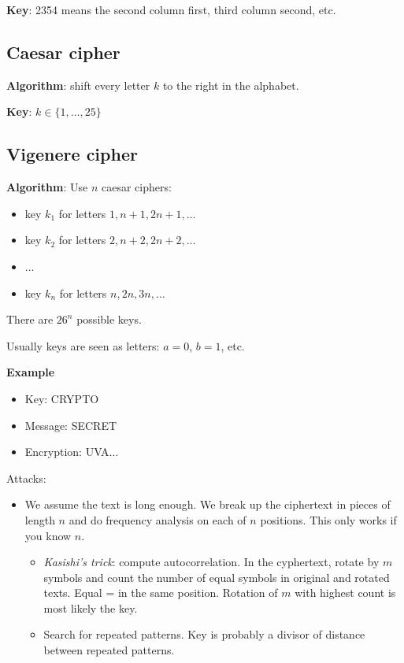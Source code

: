 \documentclass[language=english,number=]{homework}
\begin{document}
\textbf{Key}: 2354 means the second column first, third column second, etc.

\subsection{Caesar cipher}

\textbf{Algorithm}: shift every letter $k$ to the right in the alphabet.

\textbf{Key}: $k \in \{1, \dots, 25\}$

\subsection{Vigenere cipher}

\textbf{Algorithm}: Use $n$ caesar ciphers:
\begin{itemize}
\item key $k_1$ for letters $1, n+1, 2n+1, \dots$
\item key $k_2$ for letters $2, n+2, 2n+2, \dots$
\item $\dots$
\item key $k_n$ for letters $n, 2n, 3n, \dots$
\end{itemize}
There are $26^n$ possible keys.

Usually keys are seen as letters: $a=0$, $b=1$, etc.

\textbf{Example}
\begin{itemize}
\item Key: CRYPTO
\item Message: SECRET
\item Encryption: UVA...
\end{itemize}

Attacks:
\begin{itemize}
\item We assume the text is long enough. We break up the ciphertext in pieces of length $n$ and do frequency analysis on each of $n$ positions.
This only works if you know $n$.
\begin{itemize}
\item \textit{Kasishi's trick}: compute autocorrelation.
In the cyphertext, rotate by $m$ symbols and count the number of equal symbols in original and rotated texts.
Equal = in the same position.
Rotation of $m$ with highest count is most likely the key.
\item Search for repeated patterns.
Key is probably a divisor of distance between repeated patterns.
\end{itemize}
\end{itemize}
\end{document}
